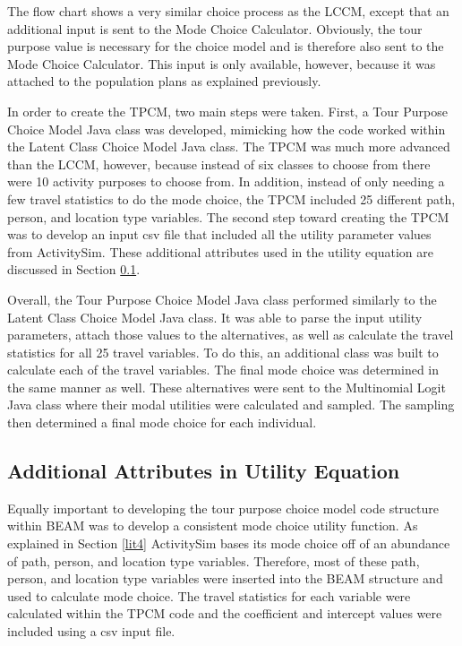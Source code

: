 \documentclass[12pt, oneside, openright]{byuthesis}
\begin{document}
The flow chart shows a very similar choice process as the LCCM, except that an additional input is sent to the Mode Choice Calculator. Obviously, the tour purpose value is necessary for the choice model and is therefore also sent to the Mode Choice Calculator. This input is only available, however, because it was attached to the population plans as explained previously.

In order to create the TPCM, two main steps were taken. First, a Tour Purpose Choice Model Java class was developed, mimicking how the code worked within the Latent Class Choice Model Java class. The TPCM was much more advanced than the LCCM, however, because instead of six classes to choose from there were 10 activity purposes to choose from. In addition, instead of only needing a few travel statistics to do the mode choice, the TPCM included 25 different path, person, and location type variables. The second step toward creating the TPCM was to develop an input csv file that included all the utility parameter values from ActivitySim. These additional attributes used in the utility equation are discussed in Section \ref{ute}.

Overall, the Tour Purpose Choice Model Java class performed similarly to the Latent Class Choice Model Java class. It was able to parse the input utility parameters, attach those values to the alternatives, as well as calculate the travel statistics for all 25 travel variables. To do this, an additional class was built to calculate each of the travel variables. The final mode choice was determined in the same manner as well. These alternatives were sent to the Multinomial Logit Java class where their modal utilities were calculated and sampled. The sampling then determined a final mode choice for each individual.

\hypertarget{ute}{%
\subsection{Additional Attributes in Utility Equation}\label{ute}}

Equally important to developing the tour purpose choice model code structure within BEAM was to develop a consistent mode choice utility function. As explained in Section \ref{lit4} ActivitySim bases its mode choice off of an abundance of path, person, and location type variables. Therefore, most of these path, person, and location type variables were inserted into the BEAM structure and used to calculate mode choice. The travel statistics for each variable were calculated within the TPCM code and the coefficient and intercept values were included using a csv input file.
\end{document}
